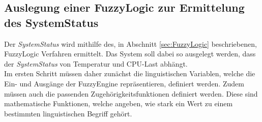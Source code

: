 \subsection{Auslegung einer FuzzyLogic zur Ermittelung des SystemStatus}\label{sec:SystemStatusErmittelung}
Der \textit{SystemStatus} wird mithilfe des, in Abschnitt \ref{sec:FuzzyLogic} beschriebenen, FuzzyLogic Verfahren ermittelt. Das System soll dabei so ausgelegt werden, dass der \textit{SystemStatus} von Temperatur und CPU-Last abhängt.\\
Im ersten Schritt müssen daher zunächst die linguistischen Variablen, welche die Ein- und Ausgänge der FuzzyEngine repräsentieren, definiert werden. Zudem müssen auch die passenden Zugehörigkeitsfunktionen definiert werden. Diese sind mathematische Funktionen, welche angeben, wie stark ein Wert zu einem bestimmten linguistischen Begriff gehört. \cite{FuzzyLogicGeeks}\\ 

